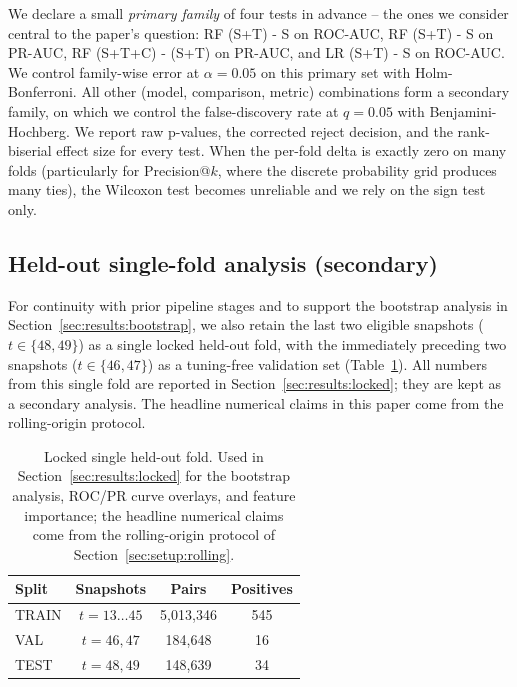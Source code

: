 \documentclass[conference]{IEEEtran}
\begin{document}
We declare a small \emph{primary family} of four tests in advance --
the ones we consider central to the paper's question: RF (S+T) - S on
ROC-AUC, RF (S+T) - S on PR-AUC, RF (S+T+C) - (S+T) on PR-AUC, and
LR (S+T) - S on ROC-AUC. We control family-wise error at
$\alpha = 0.05$ on this primary set with Holm-Bonferroni. All other
(model, comparison, metric) combinations form a secondary family, on
which we control the false-discovery rate at $q = 0.05$ with
Benjamini-Hochberg. We report raw p-values, the corrected reject
decision, and the rank-biserial effect size for every test. When the
per-fold delta is exactly zero on many folds (particularly for
Precision@$k$, where the discrete probability grid produces many
ties), the Wilcoxon test becomes unreliable and we rely on the sign
test only.

\subsection{Held-out single-fold analysis (secondary)}
\label{sec:setup:locked}

For continuity with prior pipeline stages and to support the bootstrap
analysis in Section~\ref{sec:results:bootstrap}, we also retain the
last two eligible snapshots ($t \in \{48, 49\}$) as a single locked
held-out fold, with the immediately preceding two snapshots
($t \in \{46, 47\}$) as a tuning-free validation set
(Table~\ref{tab:split}). All numbers from this single fold are
reported in Section~\ref{sec:results:locked}; they are kept as a
secondary analysis. The headline numerical claims in this paper come
from the rolling-origin protocol.

\begin{table}[t]
\caption{Locked single held-out fold. Used in
Section~\ref{sec:results:locked} for the bootstrap analysis, ROC/PR
curve overlays, and feature importance; the headline numerical
claims come from the rolling-origin protocol of
Section~\ref{sec:setup:rolling}.}
\label{tab:split}
\centering
\begin{tabular}{lccc}
\toprule
Split & Snapshots & Pairs & Positives \\
\midrule
TRAIN & $t = 13 \dots 45$ & 5{,}013{,}346 & 545 \\
VAL   & $t = 46, 47$      &   184{,}648   &  16 \\
TEST  & $t = 48, 49$      &   148{,}639   &  34 \\
\bottomrule
\end{tabular}
\end{table}
\end{document}
